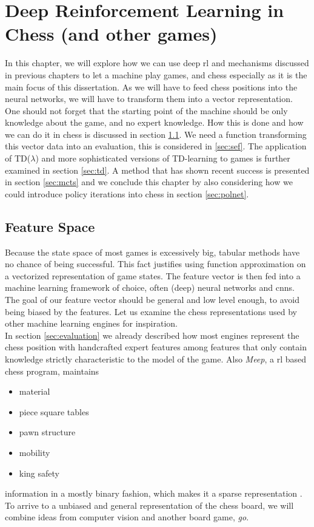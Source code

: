 \chapter{Deep Reinforcement Learning in Chess (and other games)}
\label{ch:drlgames}
In this chapter, we will explore how we can use deep \gls{rl} and mechanisms discussed in previous chapters to let a machine play games, and chess especially as it is the main focus of this dissertation. As we will have to feed chess positions into the neural networks, we will have to transform them into a vector representation. One should not forget that the starting point of the machine should be only knowledge about the game, and no expert knowledge. How this is done and how we can do it in chess is discussed in section \ref{sec:fs}. We need a function transforming this vector data into an evaluation, this is considered in \ref{sec:sef}. The application of TD($\lambda$) and more sophisticated versions of TD-learning to games is further examined in section \ref{sec:td}. A method that has shown recent success is presented in section \ref{sec:mcts} and we conclude this chapter by also considering how we could introduce policy iterations into chess in section \ref{sec:polnet}.

\section{Feature Space}
\label{sec:fs}
Because the state space of most games is excessively big, tabular methods have no chance of being successful. This fact justifies using function approximation on a vectorized representation of game states. The feature vector is then fed into a machine learning framework of choice, often (deep) neural networks and \gls{cnn}s.\\

The goal of our feature vector should be general and low level enough, to avoid being biased by the features. Let us examine the chess representations used by other machine learning engines for inspiration.\\
In section \ref{sec:evaluation} we already described how most engines represent the chess position with handcrafted expert features among features that only contain knowledge strictly characteristic to the model of the game. Also \textit{Meep}, a \gls{rl} based chess program, maintains
\begin{itemize}
\item material
\item piece square tables
\item pawn structure
\item mobility
\item king safety
\end{itemize}
information in a mostly binary fashion, which makes it a sparse representation \cite{veness09}. To arrive to a unbiased and general representation of the chess board, we will combine ideas from computer vision and another board game, \textit{go}. \\

